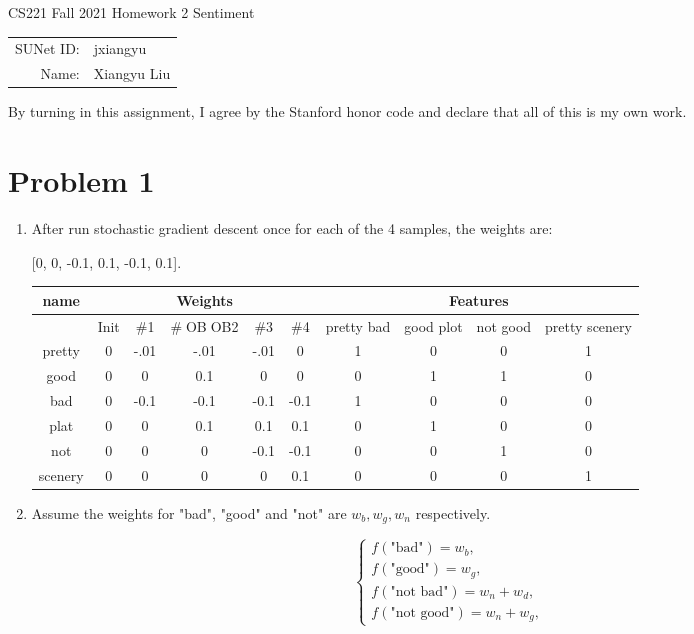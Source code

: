 \documentclass[12pt]{article}
\begin{document}
\begin{center}
{\Large CS221 Fall 2021 Homework 2 Sentiment}

\begin{tabular}{rl}
SUNet ID: & jxiangyu \\
Name: & Xiangyu Liu \\
\end{tabular}
\end{center}

By turning in this assignment, I agree by the Stanford honor code and declare
that all of this is my own work.

\section*{Problem 1}
\begin{enumerate}[label=(\alph*)]
\item

After run stochastic gradient descent once for each of the 4 samples, the weights are:

[0, 0, -0.1, 0.1, -0.1, 0.1].

\begin{tabular}{ |c|c|c|c|c|c||c|c|c|c|  }
 \hline
   name & \multicolumn{5}{|c|}{Weights} &  \multicolumn{4}{|c|}{Features} \\
  \hline
  \multicolumn{1}{|c|}{} & Init & \#1 & \#OBOB2 & \#3 & \#4 & pretty bad & good plot & not good & pretty scenery \\
  \hline
 pretty & 0 & -.01 & -.01 & -.01 & 0 & 1 & 0 & 0 & 1\\
 good & 0 & 0 & 0.1 & 0 & 0 & 0 & 1 & 1 & 0  \\
 bad & 0 & -0.1 & -0.1 & -0.1 & -0.1 & 1 & 0 & 0 & 0 \\
 plat & 0 & 0 & 0.1 & 0.1 & 0.1 & 0 & 1  & 0 & 0 \\
 not & 0 & 0 & 0 & -0.1 & -0.1  & 0 & 0 & 1  & 0  \\
 scenery & 0 & 0 & 0 & 0 & 0.1  & 0 & 0 & 0 & 1 \\
 \hline
\end{tabular}

\item
Assume the weights for "bad", "good" and "not" are \(w_b, w_g, w_n\) respectively.

\begin{equation}
\begin{cases}
    f(\text{"bad"}) = w_b, \\
    f(\text{"good"}) = w_g, \\
    f(\text{"not bad"}) = w_n + w_d, \\
    f(\text{"not good"}) = w_n + w_g,


\end{cases}
\end{equation}
\end{enumerate}
\end{document}
